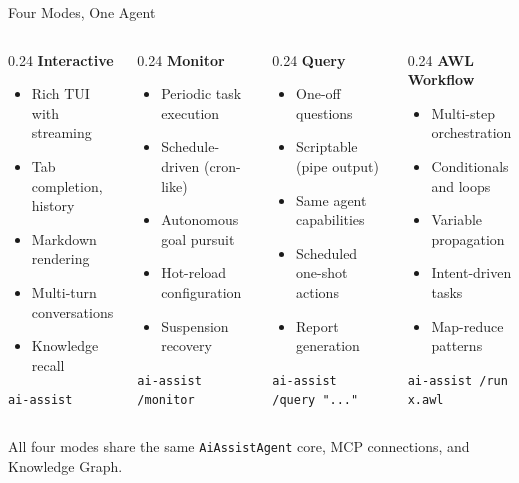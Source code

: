 \documentclass[aspectratio=169,10pt]{beamer}
\begin{document}
\begin{frame}{Four Modes, One Agent}
\begin{columns}[T]
\begin{column}{0.24\textwidth}
\textbf{\color{rhred}Interactive}
\begin{itemize}\scriptsize
  \item Rich TUI with streaming
  \item Tab completion, history
  \item Markdown rendering
  \item Multi-turn conversations
  \item Knowledge recall
\end{itemize}
\smallskip
\texttt{\scriptsize ai-assist}
\end{column}
\begin{column}{0.24\textwidth}
\textbf{\color{rhblue}Monitor}
\begin{itemize}\scriptsize
  \item Periodic task execution
  \item Schedule-driven (cron-like)
  \item \alert{Autonomous goal pursuit}
  \item Hot-reload configuration
  \item Suspension recovery
\end{itemize}
\smallskip
\texttt{\scriptsize ai-assist /monitor}
\end{column}
\begin{column}{0.24\textwidth}
\textbf{\color{rhgreen}Query}
\begin{itemize}\scriptsize
  \item One-off questions
  \item Scriptable (pipe output)
  \item Same agent capabilities
  \item Scheduled one-shot actions
  \item Report generation
\end{itemize}
\smallskip
\texttt{\scriptsize ai-assist /query "..."}
\end{column}
\begin{column}{0.24\textwidth}
\textbf{\color{rhorange}AWL Workflow}
\begin{itemize}\scriptsize
  \item Multi-step orchestration
  \item Conditionals and loops
  \item Variable propagation
  \item Intent-driven tasks
  \item Map-reduce patterns
\end{itemize}
\smallskip
\texttt{\scriptsize ai-assist /run x.awl}
\end{column}
\end{columns}

\vfill
\centering
\small All four modes share the same \texttt{AiAssistAgent} core, MCP connections, and Knowledge Graph.
\end{frame}
\end{document}
